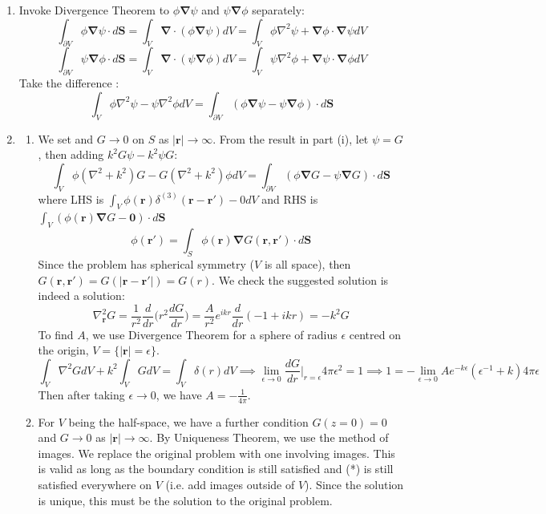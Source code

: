 \documentclass[a4paper]{article}
\begin{document}
\begin{ans}\leavevmode
\begin{enumerate}[label=(\roman*)]
\item Invoke Divergence Theorem to $\phi\boldsymbol{\nabla}\psi$ and $\psi\boldsymbol{\nabla}\phi$ separately:
$$\int_{\partial V}\phi\boldsymbol{\nabla}\psi\cdot d\mathbf{S}=\int_V\boldsymbol{\nabla}\cdot(\phi\boldsymbol{\nabla}\psi)dV=\int_V\phi\nabla^2\psi+\boldsymbol{\nabla}\phi\cdot\boldsymbol{\nabla}\psi dV$$
$$\int_{\partial V}\psi\boldsymbol{\nabla}\phi\cdot d\mathbf{S}=\int_V\boldsymbol{\nabla}\cdot(\psi\boldsymbol{\nabla}\phi)dV=\int_V\psi\nabla^2\phi+\boldsymbol{\nabla}\psi\cdot\boldsymbol{\nabla}\phi dV$$
Take the difference :
$$\int_V\phi\nabla^2\psi-\psi\nabla^2\phi dV=\int_{\partial V}(\phi\boldsymbol{\nabla}\psi-\psi\boldsymbol{\nabla}\phi)\cdot d\mathbf{S}$$
\item 
\begin{enumerate}[label=(\alph*)]
\item We set
and $G\rightarrow 0$ on $S$ as $|\mathbf{r}|\rightarrow\infty$. From the result in part (i), let $\psi=G$, then adding $k^2G\psi-k^2\psi G$:
$$\int_V\phi(\nabla^2+k^2)G-G(\nabla^2+k^2)\phi dV=\int_{\partial V}(\phi\boldsymbol{\nabla}G-\psi\boldsymbol{\nabla}G)\cdot d\mathbf{S}$$
where LHS is $\int_V\phi(\mathbf{r})\delta^{(3)}(\mathbf{r}-\mathbf{r'})-0dV$ and RHS is $\int_V(\phi(\mathbf{r})\boldsymbol{\nabla}G-\boldsymbol{0})\cdot d\mathbf{S}$
$$\phi(\mathbf{r'})=\int_S\phi(\mathbf{r})\boldsymbol{\nabla}G(\mathbf{r},\mathbf{r'})\cdot d\mathbf{S}$$
Since the problem has spherical symmetry ($V$ is all space), then $G(\mathbf{r},\mathbf{r'})=G(|\mathbf{r}-\mathbf{r'}|)=G(r)$. We check the suggested solution is indeed a solution:
$$\nabla_{\mathbf{r}}^2G=\frac{1}{r^2}\frac{d}{dr}\bigg(r^2\frac{dG}{dr}\bigg)=\frac{A}{r^2}e^{ikr}\frac{d}{dr}(-1+ikr)=-k^2G$$
To find $A$, we use Divergence Theorem for a sphere of radius $\epsilon$ centred on the origin, $V=\{|\mathbf{r}|=\epsilon\}$.
$$\int_V\nabla^2GdV+k^2\int_VGdV=\int_V\delta(r)dV\implies\lim_{\epsilon\rightarrow0}\frac{dG}{dr}\bigg|_{r=\epsilon}4\pi\epsilon^2=1\implies 1=-\lim_{\epsilon\rightarrow0}Ae^{-k\epsilon}(\epsilon^{-1}+k)4\pi\epsilon$$
Then after taking $\epsilon\rightarrow 0$, we have $A=-\frac{1}{4\pi}$.
\item For $V$ being the half-space, we have a further condition $G(z=0)=0$ and $G\rightarrow 0$ as $|\mathbf{r}|\rightarrow\infty$. By Uniqueness Theorem, we use the method of images. We replace the original problem with one involving images. This is valid as long as the boundary condition is still satisfied and (*) is still satisfied everywhere on $V$ (i.e. add images outside of $V$). Since the solution is unique, this must be the solution to the original problem.\\[5pt]

\end{enumerate}
\end{enumerate}
\end{ans}
\end{document}
